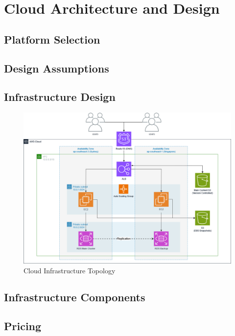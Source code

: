 \section{Cloud Architecture and Design}

\subsection{Platform Selection}



\subsection{Design Assumptions}

\subsection{Infrastructure Design}
\begin{figure}[H]\label{fig:awsdiagram}
    \centering
    \includegraphics[width=\textwidth]{cci_aws}
    \caption{Cloud Infrastructure Topology}
\end{figure}

\subsection{Infrastructure Components}

\subsection{Pricing}

